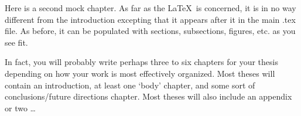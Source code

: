 
Here is a second mock chapter.  As far as the \LaTeX ~is concerned, it is in no way different from the introduction excepting that it appears after it in the main .tex file.  As before, it can be populated with sections, subsections, figures, etc. as you see fit.

In fact, you will probably write perhaps three to six chapters for your thesis depending on how your work is most effectively organized.  Most theses will contain an introduction, at least one `body' chapter, and some sort of conclusions/future directions chapter.  Most theses will also include an appendix or two \ldots